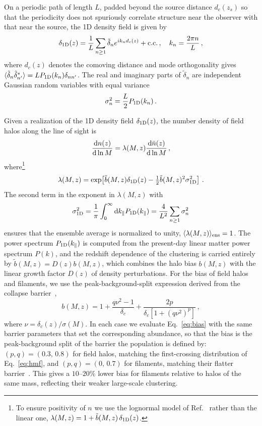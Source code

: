 \documentclass[aps,prd,10pt,nofootinbib,twocolumn,superscriptaddress,floatfix,notitlepage]{revtex4-1}
\newcommand{\td}{{\rm d}}
\newcommand{\be}{\begin{equation}}
\newcommand{\ee}{\end{equation}}
\begin{document}
On a periodic path of length $L$, padded beyond the source distance $d_c(z_s)$ so that the periodicity does not spuriously correlate structure near the observer with that near the source, the 1D density field is given by
\be
    \delta_{\rm 1D}(z) = \frac{1}{L} \sum_{n\geq 1} \tilde\delta_n e^{i k_n d_c(z)} + {\rm c.c.} \,, \quad k_n= \frac{2\pi n}{L} \,,
\ee
where $d_c(z)$ denotes the comoving distance and mode orthogonality gives $\langle\tilde\delta_n\tilde\delta_{n'}^*\rangle=LP_{\rm 1D}(k_n)\delta_{nn'}$. The real and imaginary parts of $\tilde\delta_n$ are independent Gaussian random variables with equal variance
\be
    \sigma_n^2 = \frac{L}{2} P_{\rm 1D}(k_n) \,.
\ee

Given a realization of the 1D density field $\delta_{\rm 1D}(z)$, the number density of field halos along the line of sight is
\be \label{eq:n}
    \frac{\td n(z)}{\td \ln M} = \lambda(M,z) \frac{\td \bar{n}(z)}{\td \ln M} \,,
\ee
where\footnote{To ensure positivity of $n$ we use the lognormal model of Ref.~\cite{1991MNRAS.248....1C} rather than the linear one, $\lambda(M,z) = 1+\tilde{b}(M,z)\,\delta_{\rm 1D}(z)$.}
\be
    \lambda(M,z) = \exp\!\left[ \tilde{b}(M,z) \delta_{\rm 1D}(z) - \tfrac12 \tilde{b}(M,z)^2 \sigma_{\rm 1D}^2 \right] \,.
\ee
The second term in the exponent in $\lambda(M,z)$ with
\be
    \sigma_{\rm 1D}^2 = \frac{1}{\pi} \int_0^\infty \td k_\parallel P_{\rm 1D}(k_\parallel) = \frac{4}{L^2} \sum_{n\geq 1} \sigma_n^2
\ee
ensures that the ensemble average is normalized to unity, $\langle \lambda(M,z)\rangle_{\rm ens} = 1$. The power spectrum $P_{\rm 1D}(k_\parallel)$ is computed from the present-day linear matter power spectrum $P(k)$, and the redshift dependence of the clustering is carried entirely by $\tilde b(M,z) = D(z) b(M,z)$, which combines the halo bias $b(M,z)$ with the linear growth factor $D(z)$ of density perturbations.
For the bias of field halos and filaments, we use the peak-background-split expression derived from the collapse barrier~\cite{Sheth:1999mn},
\be \label{eq:bias}
    b(M,z) = 1 + \frac{q\nu^2 - 1}{\delta_c} + \frac{2p}{\delta_c\left[1+(q\nu^2)^p\right]} \,,
\ee
where $\nu = \delta_c(z)/\sigma(M)$. In each case we evaluate Eq.~\eqref{eq:bias} with the same barrier parameters that set the corresponding abundance, so that the bias is the peak-background split of the barrier the population is defined by: $(p,q) = (0.3,\,0.8)$ for field halos, matching the first-crossing distribution of Eq.~\eqref{eq:hmf}, and $(p,q) = (0,\,0.7)$ for filaments, matching their flatter barrier~\cite{Yan:2011ux}. This gives a $10\text{--}20\%$ lower bias for filaments relative to halos of the same mass, reflecting their weaker large-scale clustering.
\end{document}
